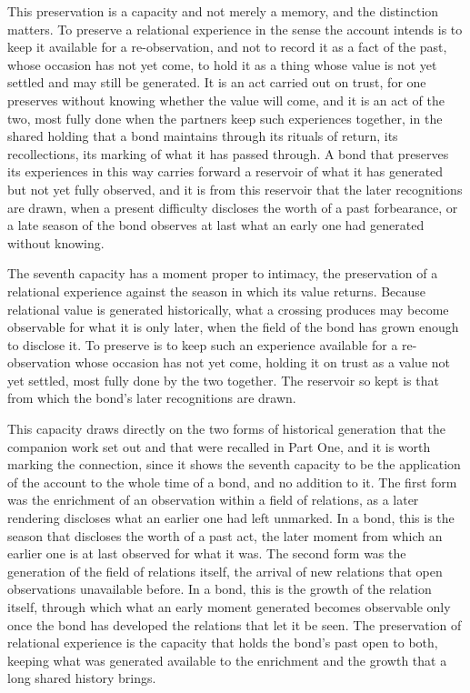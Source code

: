 This preservation is a capacity and not merely a memory, and the distinction matters. To preserve a relational experience in the sense the account intends is to keep it available for a re-observation, and not to record it as a fact of the past, whose occasion has not yet come, to hold it as a thing whose value is not yet settled and may still be generated. It is an act carried out on trust, for one preserves without knowing whether the value will come, and it is an act of the two, most fully done when the partners keep such experiences together, in the shared holding that a bond maintains through its rituals of return, its recollections, its marking of what it has passed through. A bond that preserves its experiences in this way carries forward a reservoir of what it has generated but not yet fully observed, and it is from this reservoir that the later recognitions are drawn, when a present difficulty discloses the worth of a past forbearance, or a late season of the bond observes at last what an early one had generated without knowing.

\begin{claim}
The seventh capacity has a moment proper to intimacy, the preservation of a relational experience against the season in which its value returns. Because relational value is generated historically, what a crossing produces may become observable for what it is only later, when the field of the bond has grown enough to disclose it. To preserve is to keep such an experience available for a re-observation whose occasion has not yet come, holding it on trust as a value not yet settled, most fully done by the two together. The reservoir so kept is that from which the bond's later recognitions are drawn.
\end{claim}

This capacity draws directly on the two forms of historical generation that the companion work set out and that were recalled in Part One, and it is worth marking the connection, since it shows the seventh capacity to be the application of the account to the whole time of a bond, and no addition to it. The first form was the enrichment of an observation within a field of relations, as a later rendering discloses what an earlier one had left unmarked. In a bond, this is the season that discloses the worth of a past act, the later moment from which an earlier one is at last observed for what it was. The second form was the generation of the field of relations itself, the arrival of new relations that open observations unavailable before. In a bond, this is the growth of the relation itself, through which what an early moment generated becomes observable only once the bond has developed the relations that let it be seen. The preservation of relational experience is the capacity that holds the bond's past open to both, keeping what was generated available to the enrichment and the growth that a long shared history brings.

